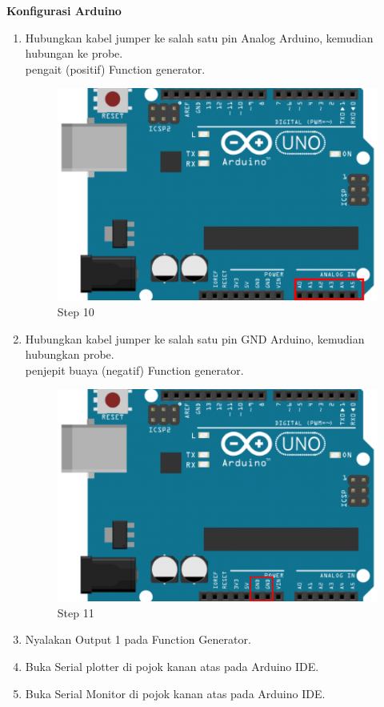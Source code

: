 \begin{center}
	\textbf{Konfigurasi Arduino}
	\begin{enumerate}
		\item Hubungkan kabel jumper ke salah satu pin Analog Arduino, kemudian hubungan ke probe.
		\\pengait (positif) Function generator.
		\begin{figure}[H]
			\centering
			\includegraphics[width=0.8\linewidth]{P2/img/per1/step 10.png}
			\caption{Step 10}
			\label{fig:Step 8(Step 10)}
		\end{figure}

		\item Hubungkan kabel jumper ke salah satu pin GND Arduino, kemudian hubungkan probe.
		\\penjepit buaya (negatif) Function generator.
		\begin{figure}[H]
			\centering
			\includegraphics[width=0.8\linewidth]{P2/img/per1/step 11.png}
			\caption{Step 11}
			\label{fig:Step 11(Step 11)}
		\end{figure}

		\item Nyalakan Output 1 pada Function Generator.
		\item Buka Serial plotter di pojok kanan atas pada Arduino IDE.
		\item Buka Serial Monitor di pojok kanan atas pada Arduino IDE.
	\end{enumerate}

\end{center}

